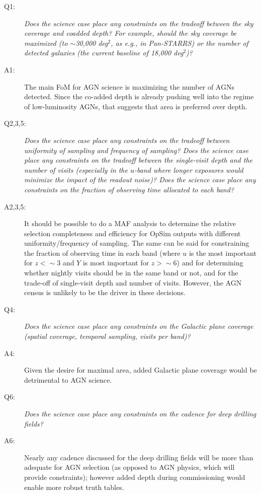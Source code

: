 \begin{description}

\item[Q1:] {\it Does the science case place any constraints on the
tradeoff between the sky coverage and coadded depth? For example, should
the sky coverage be maximized (to $\sim$30,000 deg$^2$, as e.g., in
Pan-STARRS) or the number of detected galaxies (the current baseline 
of 18,000 deg$^2$)?}

\item[A1:] The main FoM for AGN science is maximizing the number of AGNs
detected.  Since the co-added depth is already pushing well into the
regime of low-luminosity AGNs, that suggests that area is preferred over
depth.

\item[Q2,3,5:] {\it Does the science case place any constraints on the
tradeoff between uniformity of sampling and frequency of  sampling? Does
the science case place any constraints on the tradeoff between the
single-visit depth and the number of visits (especially in the $u$-band
where longer exposures would minimize the impact of the readout noise)?
Does the science case place any constraints on the fraction of observing
time allocated to each band?}

\item[A2,3,5:] It should be possible to do a MAF analysis to determine
the relative selection completeness and efficiency for OpSim outputs
with different uniformity/frequency of sampling. The same can be said
for constraining the fraction of observing time in each band (where $u$
is the most important for $z<\sim3$ and $Y$ is most important for $z>\sim6$)
and for determining whether nightly
visits should be in the same band or not, and for the trade-off of
single-visit depth and number of visits. However, the AGN census is
unlikely to be the driver in these decisions.

\item[Q4:] {\it Does the science case place any constraints on the
Galactic plane coverage (spatial coverage, temporal sampling, visits per
band)?}

\item[A4:] Given the desire for maximal area, added Galactic plane
coverage would be detrimental to AGN science.

\item[Q6:] {\it Does the science case place any constraints on the
cadence for deep drilling fields?}

\item[A6:] Nearly any cadence discussed for the deep drilling fields
will be more than adequate for AGN selection (as opposed to AGN
physics, which will provide constraints); however added depth during
commissioning would enable more robust truth tables.


\end{description}
